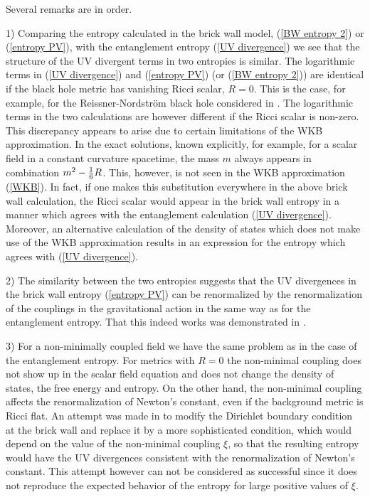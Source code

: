 \documentclass[12pt]{article}
\def\o{\over}
\begin{document}
Several remarks are in order.

1) Comparing the entropy calculated in the brick wall model, (\ref{BW entropy 2}) or (\ref{entropy PV}), with the entanglement entropy (\ref{UV divergence}) we see that the structure of the UV divergent terms in two entropies is similar. The logarithmic terms in (\ref{UV divergence}) and (\ref{entropy PV}) (or (\ref{BW entropy 2})) are identical if the black hole metric 
has vanishing Ricci scalar, $R=0$. This is the case, for example, for the Reissner-Nordstr\"{o}m black hole considered in \cite{Demers:1995dq}. The logarithmic terms in the two calculations  are however  different  if the Ricci scalar is non-zero.  This discrepancy appears to arise due to certain limitations of the WKB approximation. In the exact solutions, known explicitly, for  example, for a scalar field in a constant curvature spacetime, the mass $m$  always appears  in  combination $m^2-{1\o 6}R$. This, however, is not seen in the WKB approximation (\ref{WKB}).
In fact, if one makes this substitution everywhere in the above brick wall calculation, the Ricci scalar would appear in the brick wall entropy in a manner which agrees with the 
entanglement calculation  (\ref{UV divergence}). Moreover, an alternative calculation \cite{Fursaev:1997th} of the density of states which does not make use of the WKB approximation results in an expression for the entropy which  agrees with (\ref{UV divergence}).

2) The similarity between the two entropies suggests that the UV divergences in the brick wall entropy (\ref{entropy PV}) can be renormalized by the renormalization of the couplings in the gravitational action in the same way as for the entanglement entropy. That this indeed works was  demonstrated in \cite{Demers:1995dq}.

3) For a non-minimally coupled field we have the same problem as in the case of  the entanglement entropy. For metrics with $R=0$ the non-minimal coupling does not show up in
the scalar field equation and does not change the density of states, the free energy and entropy. On the other hand, the non-minimal coupling affects the renormalization of Newton's constant, even if the background metric is Ricci flat.  An attempt was made in \cite{Solodukhin:1996jt} to modify the Dirichlet boundary condition at the brick wall and replace it by a more sophisticated condition, which would depend on the value  of the non-minimal coupling $\xi$, so that the resulting entropy would have the UV divergences consistent with the renormalization of  Newton's constant. This attempt however can not be considered as   successful since it does not reproduce the expected behavior of the entropy for large positive values of $\xi$. 
\end{document}
